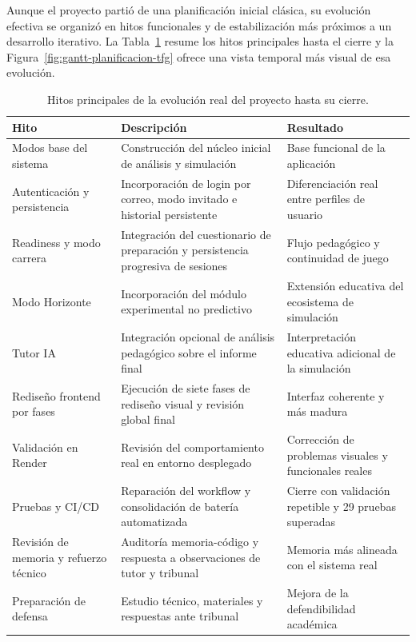 Aunque el proyecto partió de una planificación inicial clásica, su evolución efectiva se organizó en hitos funcionales y de estabilización más próximos a un desarrollo iterativo. La Tabla~\ref{tab:hitos_proyecto_final} resume los hitos principales hasta el cierre y la Figura~\ref{fig:gantt-planificacion-tfg} ofrece una vista temporal más visual de esa evolución.

\begin{table}[htbp]
\centering
\renewcommand{\arraystretch}{1.2}
\begin{tabular}{|p{}|p{}|p{}|}
\hline
\textbf{Hito} & \textbf{Descripción} & \textbf{Resultado} \\ \hline
Modos base del sistema & Construcción del núcleo inicial de análisis y simulación & Base funcional de la aplicación \\ \hline
Autenticación y persistencia & Incorporación de login por correo, modo invitado e historial persistente & Diferenciación real entre perfiles de usuario \\ \hline
Readiness y modo carrera & Integración del cuestionario de preparación y persistencia progresiva de sesiones & Flujo pedagógico y continuidad de juego \\ \hline
Modo Horizonte & Incorporación del módulo experimental no predictivo & Extensión educativa del ecosistema de simulación \\ \hline
Tutor IA & Integración opcional de análisis pedagógico sobre el informe final & Interpretación educativa adicional de la simulación \\ \hline
Rediseño frontend por fases & Ejecución de siete fases de rediseño visual y revisión global final & Interfaz coherente y más madura \\ \hline
Validación en Render & Revisión del comportamiento real en entorno desplegado & Corrección de problemas visuales y funcionales reales \\ \hline
Pruebas y CI/CD & Reparación del workflow y consolidación de batería automatizada & Cierre con validación repetible y 29 pruebas superadas \\ \hline
Revisión de memoria y refuerzo técnico & Auditoría memoria-código y respuesta a observaciones de tutor y tribunal & Memoria más alineada con el sistema real \\ \hline
Preparación de defensa & Estudio técnico, materiales y respuestas ante tribunal & Mejora de la defendibilidad académica \\ \hline
\end{tabular}
\caption{Hitos principales de la evolución real del proyecto hasta su cierre.}
\label{tab:hitos_proyecto_final}
\end{table}

